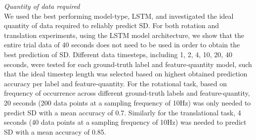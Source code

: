 \documentclass{ieeeaccess}
\begin{document}
\noindent \emph{Quantity of data required}\\
We used the best performing model-type, LSTM, and investigated the ideal quantity of data required to reliably predict SD. For both rotation and translation experiments, using the LSTM model architecture, we show that the entire trial data of 40 seconds does not need to be used in order to obtain the best prediction of SD. Different data timesteps, including 1, 2, 4, 10, 20, 40 seconds, were tested for each ground-truth label and feature-quantity model, such that the ideal timestep length was selected based on highest obtained prediction accuracy per label and feature-quantity. For the rotational task, based on frequency of occurrence across different ground-truth labels and feature-quantity, 20 seconds (200 data points at a sampling frequency of 10Hz) was only needed to predict SD with a mean accuracy of 0.7. Similarly for the translational task, 4 seconds (40 data points at a sampling frequency of 10Hz) was needed to predict SD with a mean accuracy of 0.85. 
\end{document}
